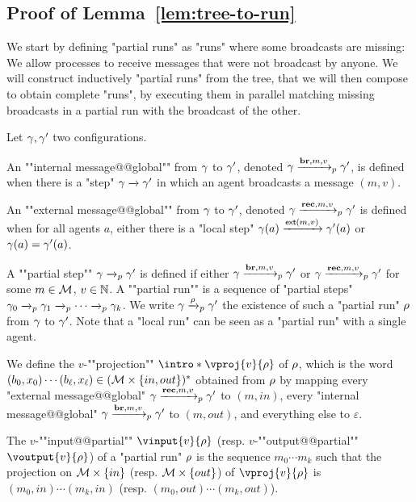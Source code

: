 \subsection{Proof of Lemma~\ref{lem:tree-to-run}}
\label{app:tree-to-run}

\LemTreeToRun*

We start by defining "partial runs" as "runs" where some broadcasts are missing: We allow processes to receive messages that were not broadcast by anyone. We will construct inductively "partial runs" from the tree, that we will then compose to obtain complete "runs", by executing them in parallel matching missing broadcasts in a partial run with the broadcast of the other.

\begin{definition}
	Let $\gamma, \gamma'$ two configurations. 
	
	An ""internal message@@global"" from $\gamma$ to $\gamma'$, denoted $\gamma \xrightarrow{\textbf{br}, m, v}_{p} \gamma'$, is defined when there is a "step" $\gamma \xrightarrow{} \gamma'$ in which an agent broadcasts a message $(m,v)$. 
	
	An ""external message@@global"" from $\gamma$ to $\gamma'$, denoted $\gamma \xrightarrow{\textbf{rec}, m, v}_{p} \gamma'$ is defined when for all agents $a$, either there is a "local step" $\gamma(a) \xrightarrow{\mathsf{ext}(m,v)} \gamma'(a)$ or $\gamma(a) = \gamma'(a)$.
	
	A ""partial step"" $\gamma \xrightarrow{}_{p} \gamma'$ is defined if either $\gamma \xrightarrow{\textbf{br}, m, v}_{p} \gamma'$ or $\gamma \xrightarrow{\textbf{rec}, m, v}_{p} \gamma'$ for some $m \in \mathcal{M}$, $v\in \mathbb{N}$.
	A ""partial run"" is a sequence of "partial steps" $\gamma_0 \xrightarrow{}_{p} \gamma_1  \xrightarrow{}_{p} \cdots \xrightarrow{}_{p} \gamma_k$. We write $\gamma \xrightarrow{\rho}_{p} \gamma'$ the existence of such a "partial run" $\rho$ from $\gamma$ to $\gamma'$.
	Note that a "local run" can be seen as a "partial run" with a single agent.
	
	We define the $v$-""projection"" $\intro*\vproj{\aval}{\run}$ of $\rho$, which is the word $(b_0, x_0) \cdots (b_\ell, x_\ell) \in (\mathcal{M} \times \{in, out\})^*$ obtained from $\rho$ by mapping every "external message@@global" $\gamma \xrightarrow{\textbf{rec}, m, v}_{p} \gamma'$ to $(m, in)$, every "internal message@@global" $\gamma \xrightarrow{\textbf{br}, m, v}_{p} \gamma'$ to $(m, out)$, and everything else to $\varepsilon$.
	
	\AP The $v$-""input@@partial"" $\vinput{v}{\run}$ (resp. $v$-""output@@partial"" $\voutput{v}{\run}$) of a "partial run" $\rho$ is the sequence $m_0 \cdots m_k$ such that the projection on $\mathcal{M} \times \{in\}$ (resp. $\mathcal{M}\times \{out\}$) of $\vproj{v}{\run}$ is $(m_0, in) \cdots (m_k, in)$ (resp. $(m_0, out)\cdots(m_k, out)$).
	

\end{definition}
